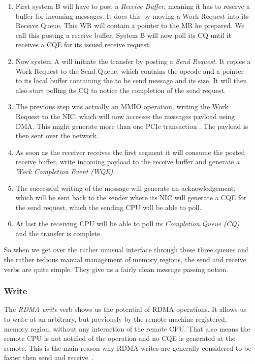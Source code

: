\begin{enumerate}
  \item First system B will have to post a \emph{Receive Buffer}, meaning it has to reserve a buffer for incoming messages.
    It does this by moving a Work Request into its Receive Queue. This WR will contain a pointer to the MR he prepared. We
    call this posting a receive buffer. System B will now poll its CQ until it receives a CQE for its issued receive request.
  \item Now system A will initiate the transfer by posting a \emph{Send Request}. It copies a Work Request to the Send 
    Queue, which contains the  opcode and a pointer to its local buffer containing the to be send message
    and its size. It will then also start polling its CQ to notice the completion of the send request.
  \item The previous step was actually an MMIO operation, writing the Work Request to the NIC, which will now 
    accesses the messages payload using DMA. This  might generate more than one PCIe transaction \cite{atc16-kalia}. 
    The payload is then sent over the network.
  \item As soon as the receiver receives the first segment it will consume the posted receive buffer, write incoming payload 
    to the receive buffer and generate a \emph{Work Completion Event (WQE)}. 
  \item The successful writing of the message will generate an acknowledgement, which will be sent back to the sender where 
    its NIC will generate a CQE for the send request, which the sending CPU will be able to poll.
  \item At last the receiving CPU will be able to poll its \emph{Completion Queue (CQ)} and the transfer is complete.
\end{enumerate}

So when we get over the rather unusual interface through these three queues and the rather tedious manual management of 
memory regions, the send and receive verbs are quite simple. They give us a fairly clean message passing notion.


\subsubsection{Write} \label{sec:bg:write}

The \emph{RDMA write} verb shows us the potential of RDMA operations. It allows us to write at an arbitrary, but previously 
by the remote machine registered, memory region, without any interaction of the remote CPU. That also means the remote CPU
is not notified of the operation and no CQE is generated at the remote. This is the main reason why RDMA writes are generally
considered to be faster then send and receive~\cite{anuj-guide}.


